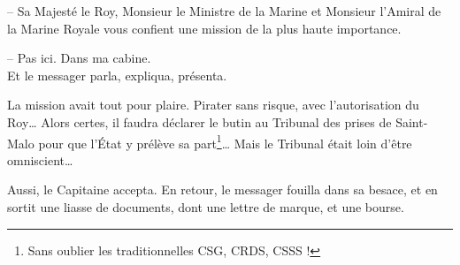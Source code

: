 -- Sa Majesté le Roy, Monsieur le Ministre de la Marine et Monsieur
   l'Amiral de la Marine Royale vous confient une mission de la plus
   haute importance.

-- Pas ici. Dans ma cabine.\\

Et le messager parla, expliqua, présenta.

La mission avait tout pour plaire. Pirater sans risque, avec
l'autorisation du Roy\ldots{} Alors certes, il faudra déclarer le
butin au Tribunal des prises de Saint-Malo pour que l'État y prélève
sa part\footnote{Sans oublier les traditionnelles CSG, CRDS, CSSS
!}\ldots{} Mais le Tribunal était loin d'être omniscient\ldots{}

Aussi, le Capitaine accepta. En retour, le messager fouilla dans sa
besace, et en sortit une liasse de documents, dont une lettre de
marque, et une bourse.\\
\newpage
